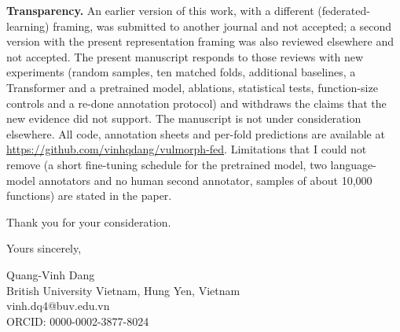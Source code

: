 \documentclass[11pt]{article}
\begin{document}
\textbf{Transparency.} An earlier version of this work, with a different
(federated-learning) framing, was submitted to another journal and not
accepted; a second version with the present representation framing was also
reviewed elsewhere and not accepted. The present manuscript responds to those
reviews with new experiments (random samples, ten matched folds, additional
baselines, a Transformer and a pretrained model, ablations, statistical tests,
function-size controls and a re-done annotation protocol) and withdraws the
claims that the new evidence did not support. The manuscript is not under
consideration elsewhere. All code, annotation sheets and per-fold predictions
are available at \url{https://github.com/vinhqdang/vulmorph-fed}. Limitations
that I could not remove (a short fine-tuning schedule for the pretrained model, two language-model
annotators and no human second annotator, samples of about 10{,}000 functions)
are stated in the paper.

Thank you for your consideration.

Yours sincerely,

Quang-Vinh Dang\\
British University Vietnam, Hung Yen, Vietnam\\
vinh.dq4@buv.edu.vn\\
ORCID: 0000-0002-3877-8024
\end{document}
